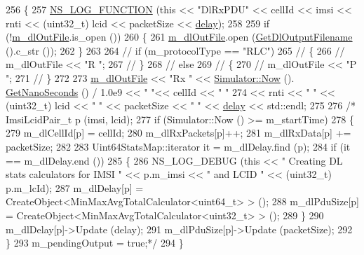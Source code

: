 \begin{DoxyCode}
256 \{
257   \hyperlink{log-macros-disabled_8h_a90b90d5bad1f39cb1b64923ea94c0761}{NS\_LOG\_FUNCTION} (\textcolor{keyword}{this} << \textcolor{stringliteral}{"DlRxPDU"} << cellId << imsi << rnti << (uint32\_t) lcid << 
      packetSize << \hyperlink{lte_2model_2fading-traces_2fading__trace__generator_8m_a7964e6aa8f61a9d28973c8267a606ad8}{delay});
258 
259   \textcolor{keywordflow}{if} (!\hyperlink{classns3_1_1MmWaveBearerStatsCalculator_a99423ed4357c6877a7fade9e721d3b1f}{m\_dlOutFile}.is\_open ())
260   \{
261         \hyperlink{classns3_1_1MmWaveBearerStatsCalculator_a99423ed4357c6877a7fade9e721d3b1f}{m\_dlOutFile}.open (\hyperlink{classns3_1_1MmWaveBearerStatsCalculator_a9649a3b1ab4040cd1492d4e95c0117b4}{GetDlOutputFilename} ().c\_str ());
262   \}
263 
264   \textcolor{comment}{// if (m\_protocolType == "RLC")}
265   \textcolor{comment}{// \{}
266   \textcolor{comment}{//    m\_dlOutFile << "R ";}
267   \textcolor{comment}{// \}}
268   \textcolor{comment}{// else}
269   \textcolor{comment}{// \{}
270   \textcolor{comment}{//    m\_dlOutFile << "P ";}
271   \textcolor{comment}{// \}}
272 
273   \hyperlink{classns3_1_1MmWaveBearerStatsCalculator_a99423ed4357c6877a7fade9e721d3b1f}{m\_dlOutFile} << \textcolor{stringliteral}{"Rx "} << \hyperlink{classns3_1_1Simulator_ac3178fa975b419f7875e7105be122800}{Simulator::Now} ().
      \hyperlink{classns3_1_1Time_a2fdb7bf0e1f5cd93b6149cb37bbb7f08}{GetNanoSeconds} () / 1.0e9 << \textcolor{stringliteral}{" "}<< cellId << \textcolor{stringliteral}{" "}
274                 << rnti << \textcolor{stringliteral}{" "} << (uint32\_t) lcid << \textcolor{stringliteral}{" "} << packetSize << \textcolor{stringliteral}{" "} << 
      \hyperlink{lte_2model_2fading-traces_2fading__trace__generator_8m_a7964e6aa8f61a9d28973c8267a606ad8}{delay} << std::endl;
275 
276  \textcolor{comment}{/* ImsiLcidPair\_t p (imsi, lcid);}
277 \textcolor{comment}{  if (Simulator::Now () >= m\_startTime)}
278 \textcolor{comment}{    \{}
279 \textcolor{comment}{      m\_dlCellId[p] = cellId;}
280 \textcolor{comment}{      m\_dlRxPackets[p]++;}
281 \textcolor{comment}{      m\_dlRxData[p] += packetSize;}
282 \textcolor{comment}{}
283 \textcolor{comment}{      Uint64StatsMap::iterator it = m\_dlDelay.find (p);}
284 \textcolor{comment}{      if (it == m\_dlDelay.end ())}
285 \textcolor{comment}{        \{}
286 \textcolor{comment}{          NS\_LOG\_DEBUG (this << " Creating DL stats calculators for IMSI " << p.m\_imsi << " and LCID " <<
       (uint32\_t) p.m\_lcId);}
287 \textcolor{comment}{          m\_dlDelay[p] = CreateObject<MinMaxAvgTotalCalculator<uint64\_t> > ();}
288 \textcolor{comment}{          m\_dlPduSize[p] = CreateObject<MinMaxAvgTotalCalculator<uint32\_t> > ();}
289 \textcolor{comment}{        \}}
290 \textcolor{comment}{      m\_dlDelay[p]->Update (delay);}
291 \textcolor{comment}{      m\_dlPduSize[p]->Update (packetSize);}
292 \textcolor{comment}{    \}}
293 \textcolor{comment}{  m\_pendingOutput = true;*/}
294 \}
\end{DoxyCode}


